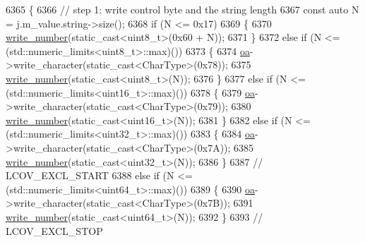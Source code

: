 \begin{DoxyCode}
6365             \{
6366                 \textcolor{comment}{// step 1: write control byte and the string length}
6367                 \textcolor{keyword}{const} \textcolor{keyword}{auto} N = j.m\_value.string->size();
6368                 \textcolor{keywordflow}{if} (N <= 0x17)
6369                 \{
6370                     \hyperlink{classnlohmann_1_1detail_1_1binary__writer_a62cfd50a511371e718f37ad7bb29ae9d}{write\_number}(static\_cast<uint8\_t>(0x60 + N));
6371                 \}
6372                 \textcolor{keywordflow}{else} \textcolor{keywordflow}{if} (N <= (std::numeric\_limits<uint8\_t>::max)())
6373                 \{
6374                     \hyperlink{classnlohmann_1_1detail_1_1binary__writer_a6f15b782a7900f50ef37d123008e601b}{oa}->write\_character(static\_cast<CharType>(0x78));
6375                     \hyperlink{classnlohmann_1_1detail_1_1binary__writer_a62cfd50a511371e718f37ad7bb29ae9d}{write\_number}(static\_cast<uint8\_t>(N));
6376                 \}
6377                 \textcolor{keywordflow}{else} \textcolor{keywordflow}{if} (N <= (std::numeric\_limits<uint16\_t>::max)())
6378                 \{
6379                     \hyperlink{classnlohmann_1_1detail_1_1binary__writer_a6f15b782a7900f50ef37d123008e601b}{oa}->write\_character(static\_cast<CharType>(0x79));
6380                     \hyperlink{classnlohmann_1_1detail_1_1binary__writer_a62cfd50a511371e718f37ad7bb29ae9d}{write\_number}(static\_cast<uint16\_t>(N));
6381                 \}
6382                 \textcolor{keywordflow}{else} \textcolor{keywordflow}{if} (N <= (std::numeric\_limits<uint32\_t>::max)())
6383                 \{
6384                     \hyperlink{classnlohmann_1_1detail_1_1binary__writer_a6f15b782a7900f50ef37d123008e601b}{oa}->write\_character(static\_cast<CharType>(0x7A));
6385                     \hyperlink{classnlohmann_1_1detail_1_1binary__writer_a62cfd50a511371e718f37ad7bb29ae9d}{write\_number}(static\_cast<uint32\_t>(N));
6386                 \}
6387                 \textcolor{comment}{// LCOV\_EXCL\_START}
6388                 \textcolor{keywordflow}{else} \textcolor{keywordflow}{if} (N <= (std::numeric\_limits<uint64\_t>::max)())
6389                 \{
6390                     \hyperlink{classnlohmann_1_1detail_1_1binary__writer_a6f15b782a7900f50ef37d123008e601b}{oa}->write\_character(static\_cast<CharType>(0x7B));
6391                     \hyperlink{classnlohmann_1_1detail_1_1binary__writer_a62cfd50a511371e718f37ad7bb29ae9d}{write\_number}(static\_cast<uint64\_t>(N));
6392                 \}
6393                 \textcolor{comment}{// LCOV\_EXCL\_STOP}

\end{DoxyCode}
